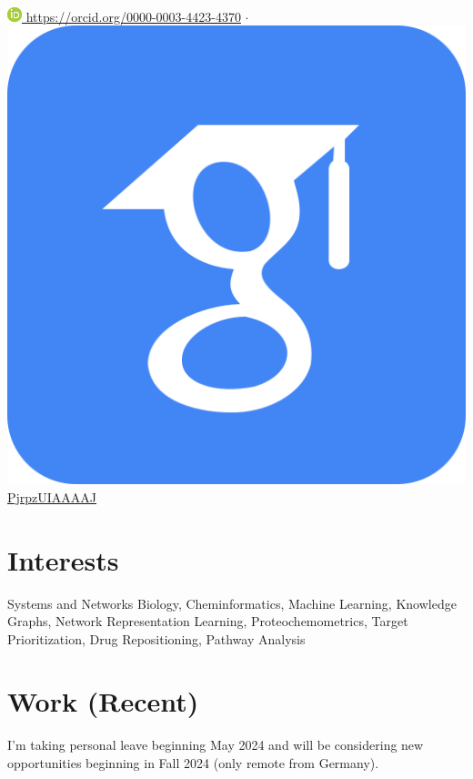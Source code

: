 \documentclass[11pt,a4paper,sans]{moderncv} %
\begin{document}
\\
\href{https://orcid.org/0000-0003-4423-4370}{\includegraphics[scale=0.5]{img/ORCIDiD_icon16x16} https://orcid.org/0000-0003-4423-4370}
$\cdot$
\href{https://scholar.google.com/citations?user=PjrpzUIAAAAJ&hl=en}{\includegraphics[scale=0.015625]{img/google_scholar_icon_130918} PjrpzUIAAAAJ}

\section{Interests}\label{sec:interests}

Systems and Networks Biology, Cheminformatics, Machine Learning, Knowledge Graphs, Network Representation Learning, Proteochemometrics, Target Prioritization, Drug Repositioning, Pathway Analysis


\section{Work (Recent)}\label{sec:work}

I'm taking personal leave beginning May 2024 and will be considering new opportunities beginning in Fall 2024 (only remote from Germany).
\\
\end{document}
